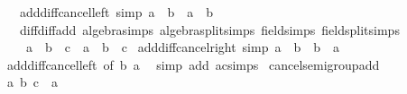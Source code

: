 \begin{isabellebody}
\ \ \ add{\isacharunderscore}{\kern0pt}diff{\isacharunderscore}{\kern0pt}cancel{\isacharunderscore}{\kern0pt}left{\isacharprime}{\kern0pt}\ {\isacharbrackleft}{\kern0pt}simp{\isacharbrackright}{\kern0pt}{\isacharcolon}{\kern0pt}\ {\isachardoublequoteopen}{\isacharparenleft}{\kern0pt}a\ {\isacharplus}{\kern0pt}\ b{\isacharparenright}{\kern0pt}\ {\isacharminus}{\kern0pt}\ a\ {\isacharequal}{\kern0pt}\ b{\isachardoublequoteclose}\isanewline
\ \ \ diff{\isacharunderscore}{\kern0pt}diff{\isacharunderscore}{\kern0pt}add\ {\isacharbrackleft}{\kern0pt}algebra{\isacharunderscore}{\kern0pt}simps{\isacharcomma}{\kern0pt}\ algebra{\isacharunderscore}{\kern0pt}split{\isacharunderscore}{\kern0pt}simps{\isacharcomma}{\kern0pt}\ field{\isacharunderscore}{\kern0pt}simps{\isacharcomma}{\kern0pt}\ field{\isacharunderscore}{\kern0pt}split{\isacharunderscore}{\kern0pt}simps{\isacharbrackright}{\kern0pt}{\isacharcolon}{\kern0pt}\isanewline
\ \ \ \ {\isachardoublequoteopen}a\ {\isacharminus}{\kern0pt}\ b\ {\isacharminus}{\kern0pt}\ c\ {\isacharequal}{\kern0pt}\ a\ {\isacharminus}{\kern0pt}\ {\isacharparenleft}{\kern0pt}b\ {\isacharplus}{\kern0pt}\ c{\isacharparenright}{\kern0pt}{\isachardoublequoteclose}\isanewline
{}\isanewline
\isanewline
{}\isamarkupfalse%
\ add{\isacharunderscore}{\kern0pt}diff{\isacharunderscore}{\kern0pt}cancel{\isacharunderscore}{\kern0pt}right{\isacharprime}{\kern0pt}\ {\isacharbrackleft}{\kern0pt}simp{\isacharbrackright}{\kern0pt}{\isacharcolon}{\kern0pt}\ {\isachardoublequoteopen}{\isacharparenleft}{\kern0pt}a\ {\isacharplus}{\kern0pt}\ b{\isacharparenright}{\kern0pt}\ {\isacharminus}{\kern0pt}\ b\ {\isacharequal}{\kern0pt}\ a{\isachardoublequoteclose}\isanewline
%
\isadelimproof
\ \ %
\endisadelimproof
%
\isatagproof
{}\isamarkupfalse%
\ add{\isacharunderscore}{\kern0pt}diff{\isacharunderscore}{\kern0pt}cancel{\isacharunderscore}{\kern0pt}left{\isacharprime}{\kern0pt}\ {\isacharbrackleft}{\kern0pt}of\ b\ a{\isacharbrackright}{\kern0pt}\ \isamarkupfalse%
\ {\isacharparenleft}{\kern0pt}simp\ add{\isacharcolon}{\kern0pt}\ ac{\isacharunderscore}{\kern0pt}simps{\isacharparenright}{\kern0pt}%
\endisatagproof
{\isafoldproof}%
%
\isadelimproof
\isanewline
%
\endisadelimproof
\isanewline
{}\isamarkupfalse%
\ cancel{\isacharunderscore}{\kern0pt}semigroup{\isacharunderscore}{\kern0pt}add\isanewline
%
\isadelimproof
%
\endisadelimproof
%
\isatagproof
{}\isamarkupfalse%
\isanewline
\ \ \isamarkupfalse%
\ a\ b\ c\ {\isacharcolon}{\kern0pt}{\isacharcolon}{\kern0pt}\ {\isacharprime}{\kern0pt}a\isanewline

\end{isabellebody}
